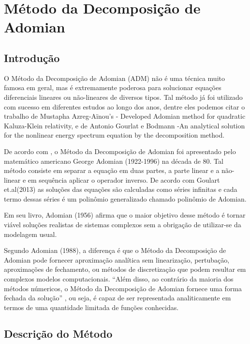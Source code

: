 
\chapter[Método da Decomposição]{Método da Decomposição de Adomian}

\section{Introdução}

   O Método da Decomposição de Adomian (ADM) não é uma técnica muito famosa em geral, mas é extremamente poderosa para solucionar equações diferenciais lineares ou não-lineares de diversos tipos. Tal método já foi utilizado com sucesso em diferentes estudos ao longo dos anos, dentre eles podemos citar o trabalho de Mustapha Azreg-Aïnou's - Developed Adomian method for quadratic Kaluza-Klein relativity, e de Antonio Gourlat e Bodmann -An analytical solution for the nonlinear energy spectrum equation by the decomposition method.
   
    De acordo com , o Método da Decomposição de Adomian foi apresentado pelo  matemático americano George Adomian (1922-1996) na década de 80. Tal método consiste em separar a equação em duas partes, a parte linear e a não-linear e em sequência aplicar o operador inverso. De acordo com Goulart et.al(2013) as soluções das equações são calculadas como séries infinitas e cada termo dessas séries é um polinômio generalizado chamado polinômio de Adomian.

    
   Em seu livro, Adomian (1956) afirma que o maior objetivo desse método é tornar viável soluções realistas de sistemas complexos sem a obrigação de utilizar-se da modelagem usual.
   
  Segundo Adomian (1988), a diferença é que o Método da Decomposição de Adomian pode fornecer aproximação analítica sem linearização, pertubação, aproximações de fechamento, ou métodos de discretização que podem resultar em complexos modelos computacionais.
   ``Além disso, ao contrário da maioria dos métodos númericos, o Método da Decomposição de Adomian fornece uma forma fechada da solução'' , ou seja, é capaz de ser representada analiticamente em termos de uma quantidade limitada de funções conhecidas.

  
   

\section{Descrição do Método} 
 
